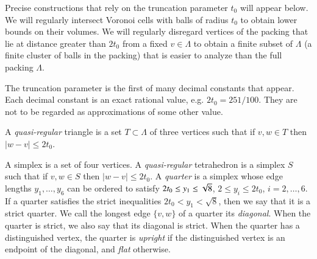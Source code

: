 \bigskip



Precise constructions that rely on the truncation parameter $t_0$
will appear below.  We will regularly intersect Voronoi cells with
balls of radius $t_0$ to obtain lower bounds on their volumes.  We
will regularly disregard vertices of the packing that lie at
distance greater than $2t_0$ from a fixed $v\in\Lambda$ to obtain
a finite subset of $\Lambda$ (a finite cluster of balls in the
packing) that is easier to analyze than the full packing
$\Lambda$.

The truncation parameter is the first of many decimal constants
that appear. Each decimal constant is an exact rational value,
e.g. $2t_0 = 251/100$.  They are not to be regarded as
approximations of some other value.

\begin{definition}
A {\it quasi-regular\/} triangle is
a set $T\subset \Lambda$ of three vertices such that if $v,w\in T$
then $|w-v|\le2t_0$. \end{definition}

\begin{definition}
A  simplex is a set of four
vertices.
A {\it quasi-regular\/} tetrahedron is a simplex $S$ such that if
$v,w\in S$ then $|w-v|\le 2t_0$. A {\it quarter\/} is a simplex
whose edge lengths $y_1,\ldots,y_6$ can be ordered to satisfy
$2t_0\le y_1\le\sqrt8$, $2\le y_i\le 2t_0$, $i=2,\ldots,6$. If a
quarter satisfies the strict inequalities $2t_0< y_1< \sqrt8$,
then we say that it is a strict quarter. We call the longest edge
$\{v,w\}$ of a quarter its {\it {} diagonal\/}. When
the quarter is strict, we also say that its diagonal is strict.
When the quarter has a distinguished vertex, the quarter is {\it
upright\/} if the distinguished vertex is an endpoint of the
diagonal, and {\it flat\/} otherwise.
\end{definition}
 
 
 



